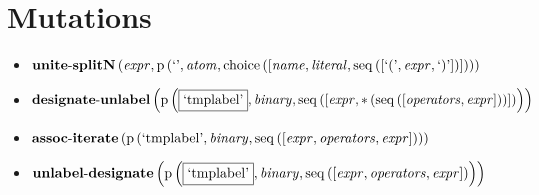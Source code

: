 \section{Mutations}
{\footnotesize\begin{itemize}
\item $\mathbf{unite\text{-}splitN}\left(\mathit{expr},\\\mathrm{p}\left(\text{`'},\mathit{atom},\mathrm{choice}\left(\left[\mathit{name}, \mathit{literal}, \mathrm{seq}\left(\left[\text{`('}, \mathit{expr}, \text{`)'}\right]\right)\right]\right)\right)\right)$
\item $\mathbf{designate\text{-}unlabel}\\\left(\mathrm{p}\left(\fbox{\text{`tmplabel'}},\mathit{binary},\mathrm{seq}\left(\left[\mathit{expr}, {*}\left(\mathrm{seq}\left(\left[\mathit{operators}, \mathit{expr}\right]\right)\right)\right]\right)\right)\right)$
\item $\mathbf{assoc\text{-}iterate}\\\left(\mathrm{p}\left(\text{`tmplabel'},\mathit{binary},\mathrm{seq}\left(\left[\mathit{expr}, \mathit{operators}, \mathit{expr}\right]\right)\right)\right)$
\item $\mathbf{unlabel\text{-}designate}\\\left(\mathrm{p}\left(\fbox{\text{`tmplabel'}},\mathit{binary},\mathrm{seq}\left(\left[\mathit{expr}, \mathit{operators}, \mathit{expr}\right]\right)\right)\right)$
\end{itemize}}

